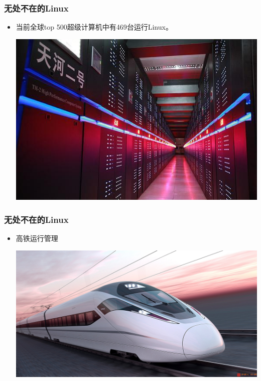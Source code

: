 \documentclass[xcolor=svgnames,bigger,presentation]{beamer}
\begin{document}
\begin{frame}
\frametitle{无处不在的Linux}
\label{sec-2-4-3}
\begin{itemize}

\item 当前全球top 500超级计算机中有469台运行Linux。
\label{sec-2-4-3-1}%
\begin{center}
\includegraphics[width=.9\linewidth]{img/tianhe.jpg}
\end{center}

\end{itemize} %
\end{frame}
\begin{frame}
\frametitle{无处不在的Linux}
\label{sec-2-4-4}
\begin{itemize}

\item 高铁运行管理
\label{sec-2-4-4-1}%
\begin{center}
\includegraphics[width=.9\linewidth]{img/train.jpg}
\end{center}

\end{itemize} %
\end{frame}
\end{document}
